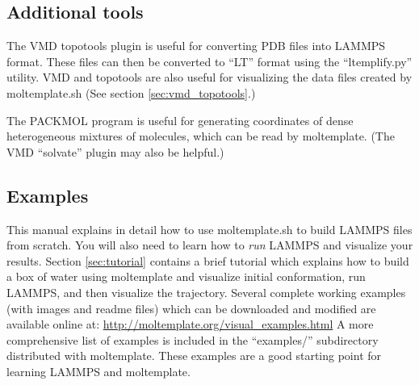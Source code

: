 \documentclass[11pt]{article}
\begin{document}
\subsection*{Additional tools}
The VMD topotools plugin \cite{topotools} is useful for 
converting PDB files into LAMMPS format.  These files can then
be converted to ``LT'' format using the ``ltemplify.py'' utility.
VMD \cite{VMD} and topotools are also useful for visualizing 
the data files created by moltemplate.sh
(See section \ref{sec:vmd_topotools}.)


The PACKMOL \cite{packmol} program is useful for generating 
coordinates of dense heterogeneous mixtures of molecules,
which can be read by moltemplate.
(The VMD ``solvate'' plugin may also be helpful.)

\subsection*{Examples}




This manual explains in detail how to use moltemplate.sh to build LAMMPS 
files from scratch.  
You will also need to learn how to \textit{run} 
LAMMPS and visualize your results.
Section \ref{sec:tutorial} contains a brief tutorial
which explains how to build a box of water using moltemplate and 
visualize initial conformation, run LAMMPS, and then visualize the trajectory. 
Several complete working examples (with images and readme files)
which can be downloaded and modified are available online at:
\url{http://moltemplate.org/visual_examples.html}
A more comprehensive list of examples is included in
the ``examples/'' subdirectory distributed with moltemplate.  
These examples are a good starting point for learning LAMMPS and moltemplate.
\end{document}
